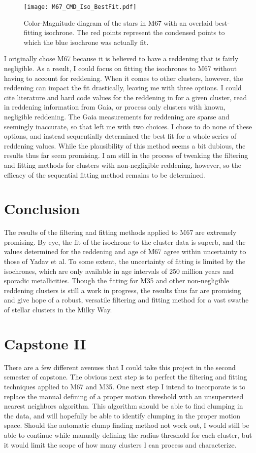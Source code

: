 \documentclass[aps,prb,twocolumn,groupedaddress,nofootinbib,floatfix]{revtex4-1}
\begin{document}
\begin{figure}[!h]
	\centering
      \texttt{[image: M67\_CMD\_Iso\_BestFit.pdf]}
	\caption{Color-Magnitude diagram of the stars in M67 with an overlaid best-fitting isochrone. The red points represent the condensed points to which the blue isochrone was actually fit.}
	\label{fig:M67_iso_best_fit}
\end{figure}


I originally chose M67 because it is believed to have a reddening that is fairly negligible. As a result, I could focus on fitting the isochrones to M67 without having to account for reddening. When it comes to other clusters, however, the reddening can impact the fit drastically, leaving me with three options. I could cite literature and hard code values for the reddening in for a given cluster, read in reddening information from Gaia, or process only clusters with known, negligible reddening. The Gaia measurements for reddening are sparse and seemingly inaccurate, so that left me with two choices. I chose to do none of these options, and instead sequentially determined the best fit for a whole series of reddening values. While the plausibility of this method seems a bit dubious, the results thus far seem promising. I am still in the process of tweaking the filtering and fitting methods for clusters with non-negligible reddening, however, so the efficacy of the sequential fitting method remains to be determined.


\section*{Conclusion}
The results of the filtering and fitting methods applied to M67 are extremely promising. By eye, the fit of the isochrone to the cluster data is superb, and the values determined for the reddening and age of M67 agree within uncertainty to those of Yadav et al. To some extent, the uncertainty of fitting is limited by the isochrones, which are only available in age intervals of 250 million years and sporadic metallicities. Though the fitting for M35 and other non-negligible reddening clusters is still a work in progress, the results thus far are promising and give hope of a robust, versatile filtering and fitting method for a vast swathe of stellar clusters in the Milky Way.

\section*{Capstone II}
There are a few different avenues that I could take this project in the second semester of capstone. The obvious next step is to perfect the filtering and fitting techniques applied to M67 and M35. One next step I intend to incorporate is to replace the manual defining of a proper motion threshold with an unsupervised nearest neighbors algorithm. This algorithm should be able to find clumping in the data, and will hopefully be able to identify clumping in the proper motion space. Should the automatic clump finding method not work out, I would still be able to continue while manually defining the radius threshold for each cluster, but it would limit the scope of how many clusters I can process and characterize.
\end{document}
